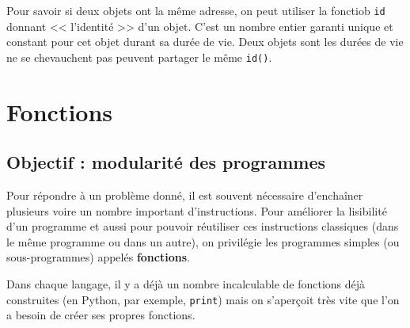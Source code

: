 Pour savoir si  deux objets ont la même adresse, on peut utiliser la fonctiob \lstinline{id} donnant << l'identité >> d'un objet.
C'est un nombre entier garanti unique et constant pour cet objet durant sa durée de vie. 
Deux objets sont les durées de vie ne se chevauchent pas peuvent partager le même \lstinline{id()}.

%
%
%







\section{Fonctions}
\subsection{Objectif : modularité des programmes}

Pour répondre à un problème donné, il est souvent nécessaire d'enchaîner plusieurs voire un nombre 
important d'instructions. Pour améliorer la lisibilité d'un programme et aussi pour pouvoir réutiliser 
ces instructions classiques (dans le même programme ou dans un autre),
on privilégie les programmes simples (ou sous-programmes) appelés \textbf{fonctions}.

Dans chaque langage, il y a déjà un nombre incalculable de fonctions déjà construites (en Python, 
par exemple, \texttt{print}) mais on s'aperçoit très vite que l'on a besoin de créer ses propres 
fonctions.


